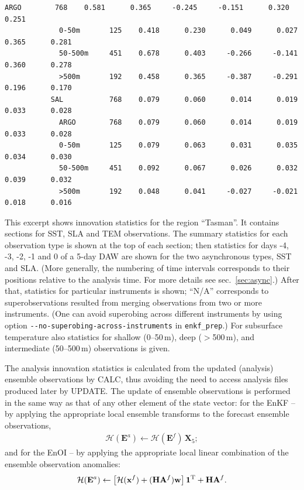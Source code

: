 \documentclass[11pt]{report}
\newcommand{\mb} {\mathbf}
\newcommand{\T}{^{\tiny \mathrm T}}
\begin{document}
\begin{Verbatim}[frame=single,fontsize=\footnotesize]
             ARGO        768    0.581      0.365     -0.245     -0.151      0.320      0.251  
             0-50m       125    0.418      0.230      0.049      0.027      0.365      0.281  
             50-500m     451    0.678      0.403     -0.266     -0.141      0.360      0.278  
             >500m       192    0.458      0.365     -0.387     -0.291      0.196      0.170  
           SAL           768    0.079      0.060      0.014      0.019      0.033      0.028  
             ARGO        768    0.079      0.060      0.014      0.019      0.033      0.028  
             0-50m       125    0.079      0.063      0.031      0.035      0.034      0.030  
             50-500m     451    0.092      0.067      0.026      0.032      0.039      0.032  
             >500m       192    0.048      0.041     -0.027     -0.021      0.018      0.016  
\end{Verbatim}
This excerpt shows innovation statistics for the region ``Tasman''.
It contains sections for SST, SLA and TEM observations.
The summary statistics for each observation type is shown at the top of each section; then statistics for days -4, -3, -2, -1 and 0 of a 5-day DAW are shown for the two asynchronous types, SST and SLA.
(More generally, the numbering of time intervals corresponds to their positions relative to the analysis time.
For more details see sec.~\ref{sec:async}.)
After that, statistics for particular instruments is shown; ``N/A'' corresponds to superobservations resulted from merging observations from two or more instruments.
(One can avoid superobing across different instruments by using option \verb|--no-superobing-across-instruments| in \verb|enkf_prep|.)
For subsurface temperature also statistics for shallow (0--50\,m), deep ($>$500\,m), and intermediate (50--500\,m) observations is given.

The analysis innovation statistics is calculated from the updated (analysis) ensemble observations by CALC, thus avoiding the need to access analysis files produced later by UPDATE.
The update of ensemble observations is performed in the same way as that of any other element of the state vector:
for the EnKF -- by applying the appropriate local ensemble transforms to the forecast ensemble observations,
\begin{align*}
  \mathcal H (\mb E^a) \leftarrow \mathcal H (\mb E^f) \, \mb X_5;
\end{align*}
and for the EnOI -- by applying the appropriate local linear combination of the ensemble observation anomalies:
\begin{align*}
  \mathcal H (\mb E^a) \leftarrow \left[ \mathcal H (\mb x^f) + (\mb H \mb A^f) \mb w\right] \mb 1\T + \mb H \mb A^f.
\end{align*}
\end{document}
